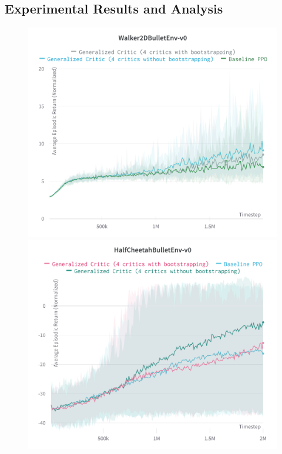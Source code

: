 \subsection{Experimental Results and Analysis}


\begin{figure}[!htb]

\begin{minipage}[b]{.5\linewidth}
  \centering
  \centerline{\includegraphics[width=\linewidth]{images/walker2D}}
\end{minipage}
\begin{minipage}[b]{.5\linewidth}
  \centering
  \centerline{\includegraphics[width=\linewidth]{images/halfcheetah}}
\end{minipage}


\end{figure}
